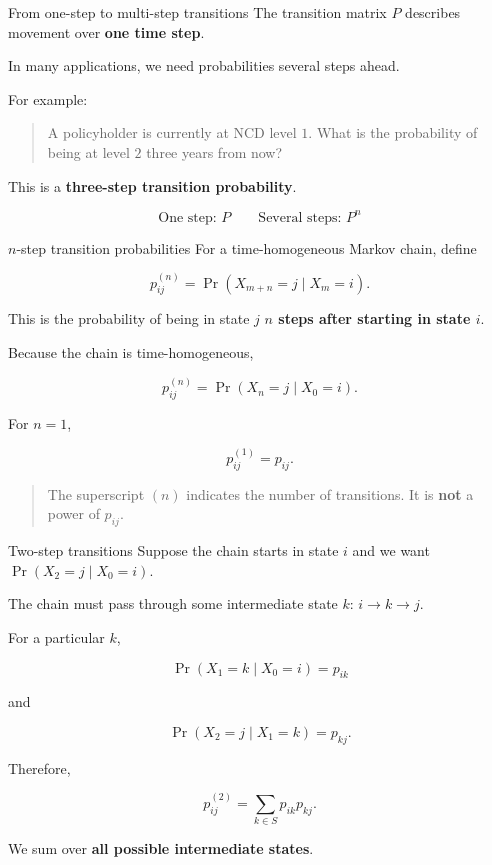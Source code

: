 \documentclass[
  ignorenonframetext,
  aspectratio=169,
]{beamer}
\begin{document}
\begin{frame}{From one-step to multi-step transitions}
\protect{}\label{from-one-step-to-multi-step-transitions-1}
The transition matrix \(P\) describes movement over \textbf{one time
step}.

In many applications, we need probabilities several steps ahead.

For example:

\begin{quote}
A policyholder is currently at NCD level \(1\). What is the probability
of being at level \(2\) three years from now?
\end{quote}

This is a \textbf{three-step transition probability}.

\[
\boxed{
\text{One step: }P
\qquad
\text{Several steps: }P^n
}
\]
\end{frame}

\begin{frame}{\(n\)-step transition probabilities}
\protect{}\label{n-step-transition-probabilities}
For a time-homogeneous Markov chain, define

\[
\boxed{
p_{ij}^{(n)}
=\Pr(X_{m+n}=j\mid X_m=i).
}
\]

This is the probability of being in state \(j\) \textbf{\(n\) steps
after starting in state \(i\)}.

Because the chain is time-homogeneous,

\[
p_{ij}^{(n)}
=\Pr(X_n=j\mid X_0=i).
\]

For \(n=1\),

\[
p_{ij}^{(1)}
=p_{ij}.
\]

\begin{quote}
The superscript \((n)\) indicates the number of transitions. It is
\textbf{not} a power of \(p_{ij}\).
\end{quote}
\end{frame}

\begin{frame}{Two-step transitions}
\protect{}\label{two-step-transitions}
Suppose the chain starts in state \(i\) and we want
\(\Pr(X_2=j\mid X_0=i).\)

The chain must pass through some intermediate state \(k\):
\(i\longrightarrow k\longrightarrow j.\)

For a particular \(k\),

\[
\Pr(X_1=k\mid X_0=i)=p_{ik}
\]

and

\[
\Pr(X_2=j\mid X_1=k)=p_{kj}.
\]

Therefore,

\[
\boxed{
p_{ij}^{(2)}
=\sum_{k\in S}p_{ik}p_{kj}.
}
\]

We sum over \textbf{all possible intermediate states}.
\end{frame}
\end{document}
